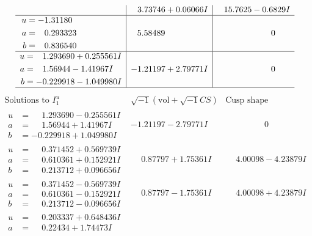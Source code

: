 \documentclass[1p]{elsarticle_modified}
\theoremstyle{definition}
\newcommand{\I}{\sqrt{-1}}
\begin{document}
$$\begin{array}{c|c|c}
 & \phantom{-}3.73746 + 0.06066 I & \phantom{-}15.7625 - 0.6829 I \\ \hline\begin{aligned}
u &= -1.31180\phantom{ +0.000000I} \\
a &= \phantom{-}0.293323\phantom{ +0.000000I} \\
b &= \phantom{-}0.836540\phantom{ +0.000000I}\end{aligned}
 & \phantom{-}5.58489\phantom{ +0.000000I} & \phantom{-0.000000 } 0 \\ \hline\begin{aligned}
u &= \phantom{-}1.293690 + 0.255561 I \\
a &= \phantom{-}1.56944 - 1.41967 I \\
b &= -0.229918 - 1.049980 I\end{aligned}
 & -1.21197 + 2.79771 I & \phantom{-0.000000 } 0\\
 \hline 
 \end{array}$$\newpage$$\begin{array}{c|c|c}  
\text{Solutions to }I^u_{1}& \I (\text{vol} + \sqrt{-1}CS) & \text{Cusp shape}\\
 \hline 
\begin{aligned}
u &= \phantom{-}1.293690 - 0.255561 I \\
a &= \phantom{-}1.56944 + 1.41967 I \\
b &= -0.229918 + 1.049980 I\end{aligned}
 & -1.21197 - 2.79771 I & \phantom{-0.000000 } 0 \\ \hline\begin{aligned}
u &= \phantom{-}0.371452 + 0.569739 I \\
a &= \phantom{-}0.610361 + 0.152921 I \\
b &= \phantom{-}0.213712 + 0.096656 I\end{aligned}
 & \phantom{-}0.87797 + 1.75361 I & \phantom{-}4.00098 - 4.23879 I \\ \hline\begin{aligned}
u &= \phantom{-}0.371452 - 0.569739 I \\
a &= \phantom{-}0.610361 - 0.152921 I \\
b &= \phantom{-}0.213712 - 0.096656 I\end{aligned}
 & \phantom{-}0.87797 - 1.75361 I & \phantom{-}4.00098 + 4.23879 I \\ \hline\begin{aligned}
u &= \phantom{-}0.203337 + 0.648436 I \\
a &= \phantom{-}0.22434 + 1.74473 I \\

\end{aligned}
\end{array}$$
\end{document}
